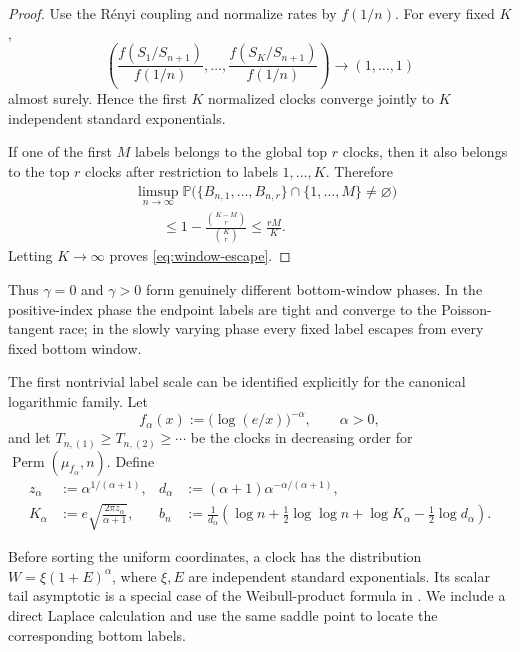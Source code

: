 \documentclass[11pt]{article}
\numberwithin{equation}{section}
\theoremstyle{definition}
\theoremstyle{remark}
\newcommand{\Pp}{\mathbb P}
\newcommand{\Perm}{\operatorname{Perm}}
\begin{document}
\begin{proof}
Use the R\'enyi coupling and normalize rates by $f(1/n)$.  For every fixed $K$,
\[
  \left(
  \frac{f(S_1/S_{n+1})}{f(1/n)},\ldots,
  \frac{f(S_K/S_{n+1})}{f(1/n)}
  \right)
  \longrightarrow(1,\ldots,1)
\]
almost surely.  Hence the first $K$ normalized clocks converge jointly to $K$ independent standard exponentials.

If one of the first $M$ labels belongs to the global top $r$ clocks, then it also belongs to the top $r$ clocks after restriction to labels $1,\ldots,K$.  Therefore
\begin{align*}
 &\limsup_{n\to\infty}
 \Pp\bigl(\{B_{n,1},\ldots,B_{n,r}\}
 \cap\{1,\ldots,M\}\neq\varnothing\bigr)\\
 &\qquad\leq
 1-\frac{\binom{K-M}{r}}{\binom{K}{r}}
 \leq\frac{rM}{K}.
\end{align*}
Letting $K\to\infty$ proves \eqref{eq:window-escape}.
\end{proof}

Thus $\gamma=0$ and $\gamma>0$ form genuinely different bottom-window phases.  In the positive-index phase the endpoint labels are tight and converge to the Poisson-tangent race; in the slowly varying phase every fixed label escapes from every fixed bottom window.

The first nontrivial label scale can be identified explicitly for the
canonical logarithmic family.  Let
\begin{equation}
  f_\alpha(x):=\bigl(\log(e/x)\bigr)^{-\alpha},
  \qquad \alpha>0,
  \label{eq:log-profile}
\end{equation}
and let $T_{n,(1)}\geq T_{n,(2)}\geq\cdots$ be the clocks in decreasing
order for $\Perm(\mu_{f_\alpha},n)$.  Define
\begin{align}
  z_\alpha&:=\alpha^{1/(\alpha+1)},&
  d_\alpha&:=(\alpha+1)\alpha^{-\alpha/(\alpha+1)},\label{eq:log-constants}\\
  K_\alpha&:=e\sqrt{\frac{2\pi z_\alpha}{\alpha+1}},&
  b_n&:=\frac1{d_\alpha}
  \left(\log n+\frac12\log\log n+\log K_\alpha
  -\frac12\log d_\alpha\right).
  \label{eq:log-centering}
\end{align}

Before sorting the uniform coordinates, a clock has the distribution
$W=\xi(1+E)^\alpha$, where $\xi,E$ are independent standard exponentials.
Its scalar tail asymptotic is a special case of the Weibull-product
formula in \cite[Lemma~2.1]{ArendarczykDebicki}.  We include a direct
Laplace calculation and use the same saddle point to locate the
corresponding bottom labels.
\end{document}

